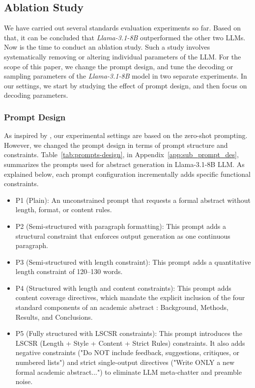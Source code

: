 \documentclass[bdcc,article,submit,pdftex,moreauthors]{Definitions/mdpi}
\begin{document}
\subsection{Ablation Study}

We have carried out several standards evaluation experiments so far. Based on that, it can be concluded that \textit{Llama-3.1-8B} outperformed the other two LLMs. Now is the time to conduct an ablation study. Such a study involves systematically removing or altering individual parameters of the LLM. For the scope of this paper, we change the prompt design, and tune the decoding or sampling parameters of the \textit{Llama-3.1-8B} model in two separate experiments. In our settings, we start by studying the effect of prompt design, and then focus on decoding parameters.

\subsubsection{Prompt Design}
\label{sub:prompt_design}

As inspired by \citet{zhang-etal-2024-benchmarking}, our experimental settings are based on the zero-shot prompting. However, we changed the prompt design in terms of prompt structure and constraints. Table~\ref{tab:prompts-design}, in Appendix~\ref{app:sub_prompt_des}, summarizes the prompts  used for abstract generation in Llama-3.1-8B LLM.  As explained below, each prompt configuration incrementally adds specific functional constraints.

\begin{itemize}
    \item P1 (Plain): An unconstrained prompt that requests a formal abstract without length, format, or content rules.
    \item P2 (Semi-structured with paragraph formatting): This prompt adds a structural constraint that enforces output generation as one continuous paragraph.
    \item P3 (Semi-structured with length constraint): This prompt adds a quantitative length constraint of 120–130 words.
    \item P4 (Structured with length and content constraints): This prompt adds content coverage directives, which mandate the explicit inclusion of the four standard components of an academic abstract : Background, Methods, Results, and Conclusions.
    \item P5 (Fully structured with LSCSR constraints): This prompt introduces the LSCSR (Length + Style + Content + Strict Rules) constraints. It also adds negative constraints ("Do NOT include feedback, suggestions, critiques, or numbered lists") and strict single-output directives ("Write ONLY a new formal academic abstract...") to eliminate LLM meta-chatter and preamble noise.  
\end{itemize}
\end{document}
